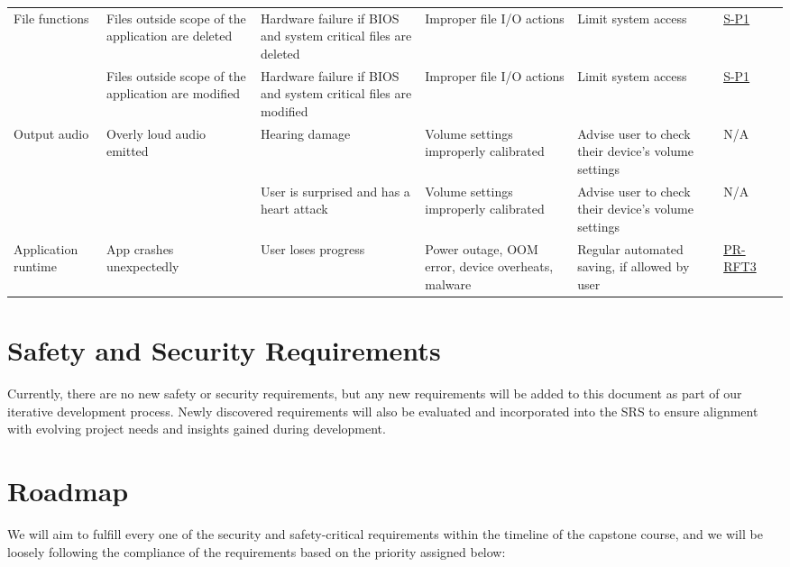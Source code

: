 \documentclass{article}
\begin{document}
\begin{longtable}{|>{\raggedright}p{2cm}|>{\raggedright}p{2.5cm}|>{\raggedright}p{2.5cm}|>{\raggedright}p{2.5cm}|>{\raggedright}p{2.5cm}|p{1.5cm}|p{1.5cm}|}
  \hline
    File \newline functions & Files outside scope of the application are deleted & Hardware failure if BIOS and system critical files are deleted & Improper file I/O actions & Limit system access & \hyperref[S-P1]{S-P1} & \\
  \cline{2-7}
    & Files outside scope of the application are modified & Hardware failure if BIOS and system critical files are modified & Improper file I/O actions & Limit system access & \hyperref[S-P1]{S-P1} & \\
  \hline
    Output \newline audio & Overly loud audio emitted & Hearing damage & Volume settings improperly calibrated & Advise user to check their device's volume settings & N/A & \\
  \cline{3-7}
    & & User is surprised and has a heart attack & Volume settings improperly calibrated & Advise user to check their device's volume settings & N/A & \\ 
  \hline
    Application runtime & App crashes unexpectedly & User loses progress & Power outage, OOM error, device overheats, malware & Regular automated saving, if allowed by user & \href{https://github.com/emilyperica/ScoreGen/blob/main/docs/SRS/SRS.pdf}{PR-RFT3} & \\
  \hline
\end{longtable}

\section{Safety and Security Requirements}

Currently, there are no new safety or security requirements, but any new requirements will be added to this document as part of our iterative development process. Newly discovered requirements will also be evaluated and incorporated into the SRS to ensure alignment with evolving project needs and insights gained during development.


\section{Roadmap}

We will aim to fulfill every one of the security and safety-critical requirements within the timeline of the capstone course, and we will be loosely following the compliance of the requirements based on the priority assigned below:
\end{document}
